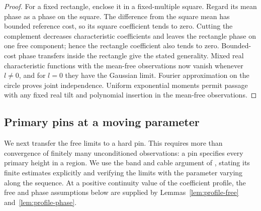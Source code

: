 \begin{proof}
For a fixed rectangle, enclose it in a fixed-multiple square. Regard
its mean phase as a phase on the square. The difference from the
square mean has bounded reference cost, so its square coefficient
tends to zero. Cutting the complement decreases characteristic
coefficients and leaves the rectangle phase on one free component;
hence the rectangle coefficient also tends to zero. Bounded-cost
phase transfers inside the rectangle give the stated generality.
Mixed real characteristic functions with the mean-free observations
now vanish whenever $l\ne0$, and for $l=0$ they have the Gaussian
limit. Fourier approximation on the circle proves joint independence.
Uniform exponential moments permit passage with any fixed real tilt
and polynomial insertion in the mean-free observations.
\end{proof}

\subsection{Primary pins at a moving parameter}

We next transfer the free limits to a hard pin.  This requires more
than convergence of finitely many unconditioned observations: a pin
specifies every primary height in a region.  We use the band and cable
argument of \cite[Section~3]{X}, stating its finite estimates explicitly
and verifying the limits with the parameter varying along the sequence.
At a positive continuity value of the coefficient profile, the free
and phase assumptions below are supplied by
Lemmas~\ref{lem:profile-free} and~\ref{lem:profile-phase}.

